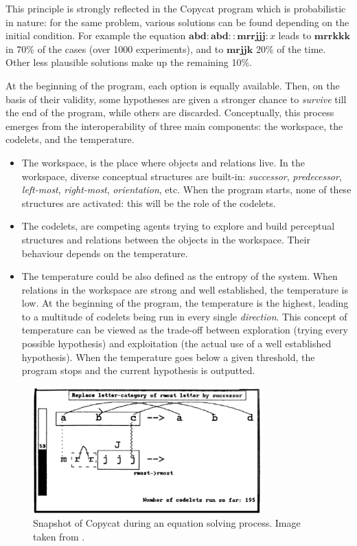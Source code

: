This principle is strongly reflected in the Copycat program which is
probabilistic in nature: for the same problem, various solutions can be found
depending on the initial condition. For example the  equation $\mathbf{abd} :
\mathbf{abd} :: \mathbf{mrrjjj} : x$ leads to $\mathbf{mrrkkk}$ in 70\% of the
cases (over 1000 experiments), and to $\mathbf{mrjjk}$ 20\% of the time. Other
less plausible solutions make up the remaining 10\%.

At the beginning of the program, each option is equally available.  Then, on
the basis of their validity, some hypotheses are given a stronger chance to
\textit{survive} till the end of the program, while others are discarded.
Conceptually, this process emerges from the interoperability of three main
components: the workspace, the codelets, and the temperature.

\begin{itemize}
    \item The workspace, is the place where objects and relations live.
      In the workspace, diverse conceptual structures are built-in:
      \textit{successor}, \textit{predecessor}, \textit{left-most},
      \textit{right-most}, \textit{orientation}, etc. When the program starts, none of these
      structures are activated: this will be the role of the codelets.
    \item The codelets, are competing agents trying to explore and build
      perceptual structures and relations between the objects in the workspace.
      Their behaviour depends on the temperature.
    \item The temperature could be also defined as the entropy of the
      system. When relations in the workspace are strong and well established,
      the temperature is low. At the beginning of the program, the temperature
      is the highest, leading to a multitude of codelets being run in every
      single \textit{direction}. This concept of temperature can be viewed as
      the trade-off between exploration (trying every possible hypothesis) and
      exploitation (the actual use of a well established hypothesis). When the
      temperature goes below a given threshold, the program stops and the
      current hypothesis is outputted.
\end{itemize}

\begin{figure}[!h]
\centering
  \includegraphics[width=3.5in]{figures/copycat.png}
\caption{Snapshot of Copycat during an equation solving process. Image taken
  from \cite{Mit01}.}
\label{FIG:copycat_snapshot}
\end{figure}

